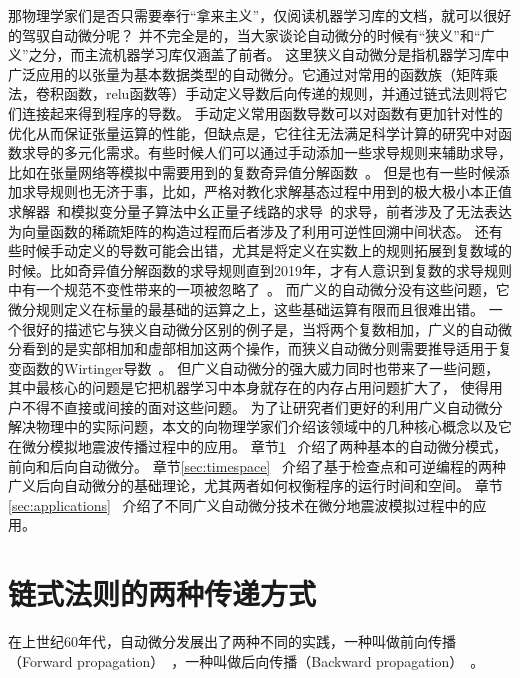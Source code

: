 \documentclass[A4,twoside,fontset=ubuntu,UTF8]{ctexart}
\begin{document}
那物理学家们是否只需要奉行“拿来主义”，仅阅读机器学习库的文档，就可以很好的驾驭自动微分呢？
并不完全是的，当大家谈论自动微分的时候有“狭义”和“广义”之分，而主流机器学习库仅涵盖了前者。
这里狭义自动微分是指机器学习库中广泛应用的以张量为基本数据类型的自动微分。它通过对常用的函数族（矩阵乘法，卷积函数，relu函数等）手动定义导数后向传递的规则，并通过链式法则将它们连接起来得到程序的导数。
手动定义常用函数导数可以对函数有更加针对性的优化从而保证张量运算的性能，但缺点是，它往往无法满足科学计算的研究中对函数求导的多元化需求。有些时候人们可以通过手动添加一些求导规则来辅助求导，比如在张量网络等模拟中需要用到的复数奇异值分解函数~\cite{Wan2019,Liao2019}。
但是也有一些时候添加求导规则也无济于事，比如，严格对教化求解基态过程中用到的极大极小本正值求解器~\cite{Xie2020}和模拟变分量子算法中幺正量子线路的求导~\cite{Luo2019}的求导，前者涉及了无法表达为向量函数的稀疏矩阵的构造过程而后者涉及了利用可逆性回溯中间状态。
还有些时候手动定义的导数可能会出错，尤其是将定义在实数上的规则拓展到复数域的时候。比如奇异值分解函数的求导规则直到2019年，才有人意识到复数的求导规则中有一个规范不变性带来的一项被忽略了~\cite{Wan2019}。
而广义的自动微分没有这些问题，它微分规则定义在标量的最基础的运算之上，这些基础运算有限而且很难出错。
    一个很好的描述它与狭义自动微分区别的例子是，当将两个复数相加，广义的自动微分看到的是实部相加和虚部相加这两个操作，而狭义自动微分则需要推导适用于复变函数的Wirtinger导数~\cite{Hirose2003}。
但广义自动微分的强大威力同时也带来了一些问题，其中最核心的问题是它把机器学习中本身就存在的内存占用问题扩大了，
使得用户不得不直接或间接的面对这些问题。
为了让研究者们更好的利用广义自动微分解决物理中的实际问题，本文的向物理学家们介绍该领域中的几种核心概念以及它在微分模拟地震波传播过程中的应用。
章节\ref{sec:forwardbackward}~ 介绍了两种基本的自动微分模式，前向和后向自动微分。
章节\ref{sec:timespace}~ 介绍了基于检查点和可逆编程的两种广义后向自动微分的基础理论，尤其两者如何权衡程序的运行时间和空间。
章节\ref{sec:applications}~ 介绍了不同广义自动微分技术在微分地震波模拟过程中的应用。

\section{链式法则的两种传递方式}\label{sec:forwardbackward}

    在上世纪60年代，自动微分发展出了两种不同的实践，一种叫做前向传播（Forward propagation）~\cite{Wengert1964}，一种叫做后向传播（Backward propagation）~\cite{Boltyanski1960}。
\end{document}
